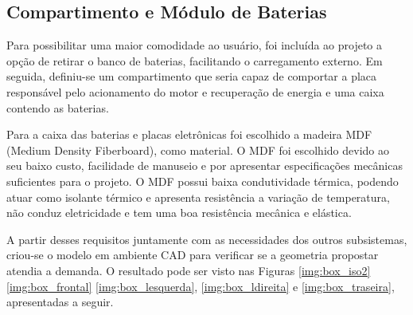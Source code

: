 	\subsection{Compartimento e Módulo de Baterias}
	Para possibilitar uma maior comodidade ao usuário, foi incluída ao projeto a opção de retirar o banco de baterias, facilitando o carregamento externo. Em seguida, definiu-se um compartimento que seria capaz de comportar a placa responsável pelo acionamento do motor e recuperação de energia e uma caixa contendo as baterias.
	
	Para a caixa das baterias e placas eletrônicas foi escolhido a madeira MDF (Medium Density Fiberboard), como material. O MDF foi escolhido devido ao seu baixo custo, facilidade de manuseio e por apresentar especificações mecânicas suficientes para o projeto. O MDF possui baixa condutividade térmica, podendo atuar como isolante térmico e apresenta resistência a variação de temperatura, não conduz eletricidade e tem uma boa resistência mecânica e elástica.
	
	A partir desses requisitos juntamente com as necessidades dos outros subsistemas, criou-se o modelo em ambiente CAD para verificar se a geometria propostar atendia a demanda. O resultado pode ser visto nas Figuras \ref{img:box_iso2} \ref{img:box_frontal} \ref{img:box_lesquerda}, \ref{img:box_ldireita} e \ref{img:box_traseira}, apresentadas a seguir.
	
